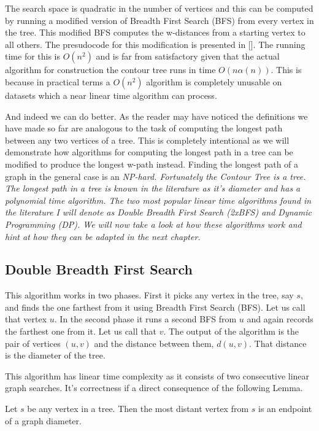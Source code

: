 The search space is quadratic in the number of vertices and this can be computed by running a modified version of Breadth First Search (BFS) from every vertex in the tree. This modified BFS computes the w-distances from a starting vertex to all others. The presudocode for this modification is presented in []. The running time for this is $O(n^2)$ and is far from satisfactory given that the actual algorithm for construction the contour tree runs in time $O(n\alpha(n))$. This is because in practical terms a $O(n^2)$ algorithm is completely unusable on datasets which a near linear time algorithm can process.

And indeed we can do better. As the reader may have noticed the definitions we have made so far are analogous to the task of computing the longest path between any two vertices of a tree. This is completely intentional as we will demonstrate how algorithms for computing the longest path in a tree can be modified to produce the longest w-path instead. Finding the longest path of a graph in the general case is an \em NP-hard\em. Fortunately the Contour Tree is a tree. The longest path in a tree is known in the literature as it's diameter and has a polynomial time algorithm. The two most popular linear time algorithms found in the literature I will denote as Double Breadth First Search (2xBFS) and Dynamic Programming (DP). We will now take a look at how these algorithms work and hint at how they can be adapted in the next chapter.


\subsection{Double Breadth First Search}

This algorithm works in two phases. First it picks any vertex in the tree, say $s$, and finds the one farthest from it using Breadth First Search (BFS). Let us call that vertex $u$. In the second phase it runs a second BFS from $u$ and again records the farthest one from it. Let us call that $v$. The output of the algorithm is the pair of vertices $(u, v)$ and the distance between them, $d(u, v)$. That distance is the diameter of the tree.

This algorithm has linear time complexity as it consists of two consecutive linear graph searches. It's correctness if a direct consequence of the following Lemma.

\begin{lem} Let $s$ be any vertex in a tree. Then the most distant vertex from $s$ is an endpoint of a graph diameter. \end{lem}


